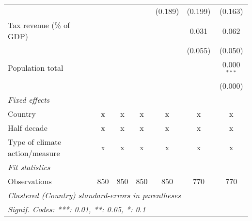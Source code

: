 \begin{tabular}{lcccccc}
                                                 &              &              &              & (0.189)        & (0.199)        & (0.163)\\   
   Tax revenue (\% of GDP)                       &              &              &              &                & 0.031          & 0.062\\   
                                                 &              &              &              &                & (0.055)        & (0.050)\\   
   Population total                              &              &              &              &                &                & 0.000$^{***}$\\   
                                                 &              &              &              &                &                & (0.000)\\   
   \emph{Fixed effects}\\
   Country                                       & x            & x            & x            & x              & x              & x\\  
   Half decade                                   & x            & x            & x            & x              & x              & x\\  
   Type of climate action/measure                & x            & x            & x            & x              & x              & x\\  
   \midrule \emph{Fit statistics}\\
   Observations                                  & 850          & 850          & 850          & 850            & 770            & 770\\  
   \midrule
   \multicolumn{7}{l}{\emph{Clustered (Country) standard-errors in parentheses}}\\
   \multicolumn{7}{l}{\emph{Signif. Codes: ***: 0.01, **: 0.05, *: 0.1}}\\
\end{tabular}
\par\endgroup


